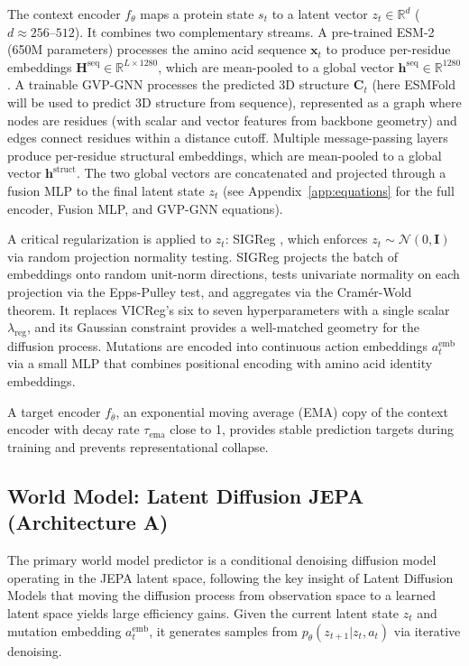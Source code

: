 \documentclass[12pt, a4paper]{article}
\begin{document}
The context encoder $f_\theta$ maps a protein state $s_t$ to a latent vector $z_t \in \mathbb{R}^d$ ($d \approx 256$--$512$). It combines two complementary streams. A pre-trained ESM-2 \citep{lin2023esm2} (650M parameters) processes the amino acid sequence $\mathbf{x}_t$ to produce per-residue embeddings $\mathbf{H}^\text{seq} \in \mathbb{R}^{L \times 1280}$, which are mean-pooled to a global vector $\mathbf{h}^\text{seq} \in \mathbb{R}^{1280}$. A trainable GVP-GNN \citep{jing2021gvp} processes the predicted 3D structure $\mathbf{C}_t$ (here ESMFold will be used to predict 3D structure from sequence), represented as a graph where nodes are residues (with scalar and vector features from backbone geometry) and edges connect residues within a distance cutoff. Multiple message-passing layers produce per-residue structural embeddings, which are mean-pooled to a global vector $\mathbf{h}^\text{struct}$. The two global vectors are concatenated and projected through a fusion MLP to the final latent state $z_t$ (see Appendix~\ref{app:equations} for the full encoder, Fusion MLP, and GVP-GNN equations).

A critical regularization is applied to $z_t$: SIGReg \citep{maes2026leworldmodel}, which enforces $z_t \sim \mathcal{N}(0, \mathbf{I})$ via random projection normality testing. SIGReg projects the batch of embeddings onto random unit-norm directions, tests univariate normality on each projection via the Epps-Pulley test, and aggregates via the Cram\'{e}r-Wold theorem. It replaces VICReg's six to seven hyperparameters with a single scalar $\lambda_\text{reg}$, and its Gaussian constraint provides a well-matched geometry for the diffusion process. Mutations are encoded into continuous action embeddings $a_t^\text{emb}$ via a small MLP that combines positional encoding with amino acid identity embeddings.

A target encoder $f_{\bar{\theta}}$, an exponential moving average (EMA) copy of the context encoder with decay rate $\tau_\text{ema}$ close to 1, provides stable prediction targets during training and prevents representational collapse.

\subsection{World Model: Latent Diffusion JEPA (Architecture A)}

The primary world model predictor is a conditional denoising diffusion model \citep{ho2020ddpm} operating in the JEPA latent space, following the key insight of Latent Diffusion Models \citep{rombach2022ldm} that moving the diffusion process from observation space to a learned latent space yields large efficiency gains. Given the current latent state $z_t$ and mutation embedding $a_t^\text{emb}$, it generates samples from $p_\theta(z_{t+1} | z_t, a_t)$ via iterative denoising.
\end{document}
